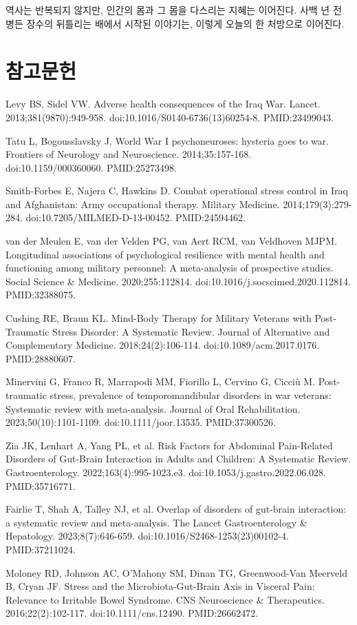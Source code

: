 \documentclass[11pt,oneside]{book}
\newcommand{\refstart}{\par\begingroup\footnotesize\setlength{\parskip}{2.5pt}\raggedright}
\newcommand{\reff}[2]{\par\hangindent=7mm\hangafter=1\noindent[#1]\hspace{2mm}#2\par}
\begin{document}
역사는 반복되지 않지만, 인간의 몸과 그 몸을 다스리는 지혜는 이어진다. 사백 년 전 병든 장수의 뒤틀리는 배에서 시작된 이야기는, 이렇게 오늘의 한 처방으로 이어진다.

\section*{참고문헌}
\refstart
\reff{1}{Levy BS, Sidel VW. Adverse health consequences of the Iraq War. Lancet. 2013;381(9870):949-958. doi:10.1016/S0140-6736(13)60254-8. PMID:23499043.}
\reff{2}{Tatu L, Bogousslavsky J. World War I psychoneuroses: hysteria goes to war. Frontiers of Neurology and Neuroscience. 2014;35:157-168. doi:10.1159/000360060. PMID:25273498.}
\reff{3}{Smith-Forbes E, Najera C, Hawkins D. Combat operational stress control in Iraq and Afghanistan: Army occupational therapy. Military Medicine. 2014;179(3):279-284. doi:10.7205/MILMED-D-13-00452. PMID:24594462.}
\reff{4}{van der Meulen E, van der Velden PG, van Aert RCM, van Veldhoven MJPM. Longitudinal associations of psychological resilience with mental health and functioning among military personnel: A meta-analysis of prospective studies. Social Science \& Medicine. 2020;255:112814. doi:10.1016/j.socscimed.2020.112814. PMID:32388075.}
\reff{5}{Cushing RE, Braun KL. Mind-Body Therapy for Military Veterans with Post-Traumatic Stress Disorder: A Systematic Review. Journal of Alternative and Complementary Medicine. 2018;24(2):106-114. doi:10.1089/acm.2017.0176. PMID:28880607.}
\reff{6}{Minervini G, Franco R, Marrapodi MM, Fiorillo L, Cervino G, Cicciù M. Post-traumatic stress, prevalence of temporomandibular disorders in war veterans: Systematic review with meta-analysis. Journal of Oral Rehabilitation. 2023;50(10):1101-1109. doi:10.1111/joor.13535. PMID:37300526.}
\reff{7}{Zia JK, Lenhart A, Yang PL, et al. Risk Factors for Abdominal Pain-Related Disorders of Gut-Brain Interaction in Adults and Children: A Systematic Review. Gastroenterology. 2022;163(4):995-1023.e3. doi:10.1053/j.gastro.2022.06.028. PMID:35716771.}
\reff{8}{Fairlie T, Shah A, Talley NJ, et al. Overlap of disorders of gut-brain interaction: a systematic review and meta-analysis. The Lancet Gastroenterology \& Hepatology. 2023;8(7):646-659. doi:10.1016/S2468-1253(23)00102-4. PMID:37211024.}
\reff{9}{Moloney RD, Johnson AC, O'Mahony SM, Dinan TG, Greenwood-Van Meerveld B, Cryan JF. Stress and the Microbiota-Gut-Brain Axis in Visceral Pain: Relevance to Irritable Bowel Syndrome. CNS Neuroscience \& Therapeutics. 2016;22(2):102-117. doi:10.1111/cns.12490. PMID:26662472.}
\end{document}

